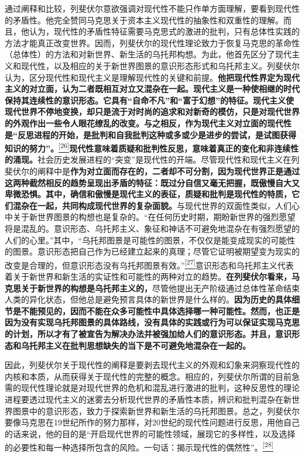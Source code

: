 \documentclass[UTF8, fontset = sourcesans, a4paper, oneside, zihao =
-4, scheme=chinese, no-math, space=true]{ctexbook}
\begin{document}
通过阐释和比较，列斐伏尔意欲强调对现代性不能只作单方面理解，要看到现代性的矛盾性。他完全赞同马克思关于资本主义现代性的抽象性和双重性的理解。而且，他认为，现代性的矛盾性特征需要马克思式的激进的批判，只有总体性实践的方法才能真正改变世界。因而，列斐伏尔的现代性理论致力于恢复马克思的革命性（总体性）的方法和对新世界、新生活的乌托邦构想。为此，他首先区分了现代主义和现代性，以及相应的关于新世界图景的意识形态形式和乌托邦主义。列斐伏尔认为，区分现代性和现代主义是理解现代性的关键和前提。\textbf{他把现代性界定为现代主义的对立面，认为二者既相互对立又混杂在一起。现代主义是一种使相继的时代保持其连续性的意识形态。它具有``自命不凡''和``富于幻想''的特征。现代主义使现代世界不停地变换，却只是流于对时尚的追求和对新奇的模仿，只是对现代世界的外观作出一些令人眼花缭乱的改变。与之相反，作为现代主义对立面的现代性是``反思进程的开始，是批判和自我批判这种或多或少是进步的尝试，是试图获得知识的努力''。}\protect\hypertarget{part0005_split_002.htmlux5cux23w26}{}{}\protect\hyperlink{part0005_split_003.htmlux5cux23m26}{\textsuperscript{{[}26{]}}}\textbf{现代性意味着质疑和批判性反思，意味着真正的变化和非连续性的涌现。}社会历史发展进程的``突变''是现代性的开端。尽管现代性和现代主义在列斐伏尔的阐释中是\textbf{作为对立面而存在的，二者却不可分割，因为现代世界正是通过这两种截然相反的趋势呈现出矛盾的特征：既过分自信又毫无把握，既傲慢自大又卑微恐惧。其中，确信和傲慢是现代主义的表征，质疑和批判是现代性的特质，它们混杂在一起，共同构成现代世界的复杂面貌。}与现代世界的双面性类似，人们心中关于新世界图景的构想也是复杂的。``在任何历史时期，期盼新世界的强烈愿望将是混乱的。意识形态、乌托邦主义、象征和神话不可避免地混杂在有强烈愿望的人们的心里。''其中，``乌托邦图景是可能性的图景，不仅仅是能变成现实的可能性的图景。意识形态把自己作为已经建立起来的真理；尽管它证明被期望变为现实的改变是合理的，但意识形态没有乌托邦图景有效。''\protect\hypertarget{part0005_split_002.htmlux5cux23w27}{}{}\protect\hyperlink{part0005_split_003.htmlux5cux23m27}{\textsuperscript{{[}27{]}}}意识形态和乌托邦主义代表着关于新世界和新生活的实证性和可能性的两种对立的趋势。\textbf{在列斐伏尔看来，马克思关于新世界的构想是乌托邦主义的，}尽管他提出无产阶级通过总体性革命结束人类的异化状态，但他总是避免预言具体的新世界是什么样的。\textbf{因为历史的具体细节是不能预见的，因而不能在众多可能性中具体选择哪一种可能性。然而，也正是因为没有实现乌托邦图景的具体路线，没有具体的实践或行为可以保证实现马克思的计划，所以才有了被宣告为解决办法并被强加给人们的意识形态。并且，意识形态和乌托邦主义在批判思想缺失的当下是不可避免地混杂在一起的。}

因此，列斐伏尔关于现代性的阐释是要剥去现代主义的外观和幻象来洞察现代性的内核和本质，从而获得关于现代性的完整的概念。相应的，列斐伏尔所谓的目前急需的现代性理论就是对现代世界的危机和混乱进行激进的批判，这种反思性的理论进程要透过现代主义的迷雾去分析现代世界的矛盾性本质，辨识和批判混杂在新世界图景中的意识形态，致力于探索新世界和新生活的乌托邦图景。总之，列斐伏尔要像马克思在19世纪所作的努力那样，对20世纪的现代性问题进行反思，用他自己的话来说，他的目的是``开启现代世界的可能性领域，展现它的多样性，以及选择的必要性和每一种选择所包含的风险。一句话：揭示现代性的偶然性''。\protect\hypertarget{part0005_split_002.htmlux5cux23w28}{}{}\protect\hyperlink{part0005_split_003.htmlux5cux23m28}{\textsuperscript{{[}28{]}}}
\end{document}
